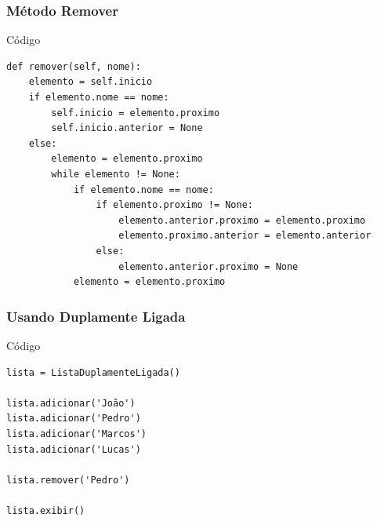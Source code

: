 \documentclass{beamer}
\begin{document}
\begin{frame}[fragile]
\frametitle{Método Remover}

\begin{exampleblock}{Código}

\begin{lstlisting}
def remover(self, nome):
    elemento = self.inicio
    if elemento.nome == nome:
        self.inicio = elemento.proximo
        self.inicio.anterior = None
    else:
        elemento = elemento.proximo
        while elemento != None:
            if elemento.nome == nome:
                if elemento.proximo != None:
                    elemento.anterior.proximo = elemento.proximo
                    elemento.proximo.anterior = elemento.anterior
                else:
                    elemento.anterior.proximo = None
            elemento = elemento.proximo
\end{lstlisting}

\end{exampleblock}
\end{frame}

\begin{frame}[fragile]
\frametitle{Usando Duplamente Ligada}

\begin{exampleblock}{Código}

\begin{lstlisting}
lista = ListaDuplamenteLigada()

lista.adicionar('João')
lista.adicionar('Pedro')
lista.adicionar('Marcos')
lista.adicionar('Lucas')

lista.remover('Pedro')

lista.exibir()
\end{lstlisting}

\end{exampleblock}
\end{frame}
\end{document}
